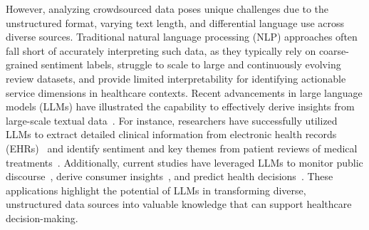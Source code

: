 \documentclass[journal,twoside,web]{ieeecolor}
\begin{document}
However, analyzing crowdsourced data poses unique challenges due to the unstructured format, varying text length, and differential language use across diverse sources. Traditional natural language processing (NLP) approaches often fall short of accurately interpreting such data, as they typically rely on coarse-grained sentiment labels, struggle to scale to large and continuously evolving review datasets, and provide limited interpretability for identifying actionable service dimensions in healthcare contexts. Recent advancements in large language models (LLMs) have illustrated the capability to effectively derive insights from large-scale textual data~\cite{li2024scoping,gao2024examining}. For instance, researchers have successfully utilized LLMs to extract detailed clinical information from electronic health records (EHRs)~\cite{yang2022large} and identify sentiment and key themes from patient reviews of medical treatments~\cite{kornblith2025analyzing}. Additionally, current studies have leveraged LLMs to monitor public discourse~\cite{espinosa2024use}, derive consumer insights~\cite{matheny2024enhancing}, and predict health decisions~\cite{ding2024leveraging}. These applications highlight the potential of LLMs in transforming diverse, unstructured data sources into valuable knowledge that can support healthcare decision-making.
\end{document}
